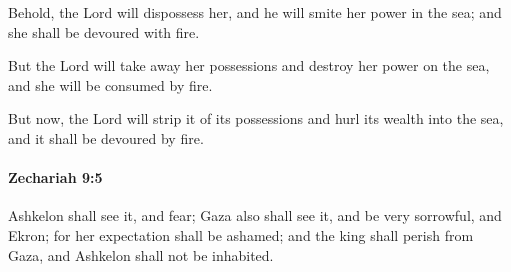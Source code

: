 			\begin{versebox}
					\item[BHS] 
					\item[LXX] 
					\item[ASV] Behold, the Lord will dispossess her, and he will smite her power in the sea; and she shall be devoured with fire.
					\item[NIV] But the Lord will take away her possessions and destroy her power on the sea, and she will be consumed by fire.
					\item[NRSV] But now, the Lord will strip it of its possessions and hurl its wealth into the sea, and it shall be devoured by fire.
			\end{versebox}

		\paragraph{Zechariah 9:5} %
			\label{ZECHARIAH-9-5}

			Ashkelon shall see it, and fear; Gaza also shall see it, and be very sorrowful, and Ekron; for her expectation shall be ashamed; and the king shall perish from Gaza, and Ashkelon shall not be inhabited.

